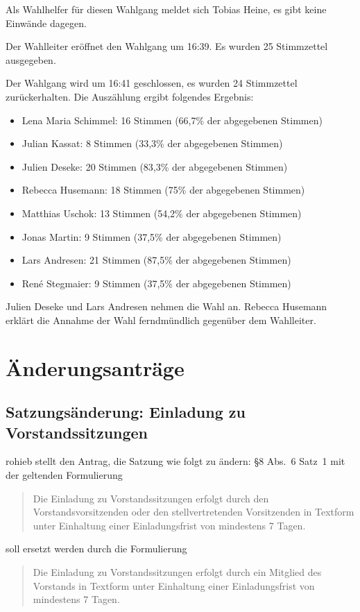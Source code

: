 \documentclass[a4paper,12pt]{scrartcl}
\begin{document}
Als Wahlhelfer für diesen Wahlgang meldet sich Tobias Heine, es gibt keine
Einwände dagegen.

Der Wahlleiter eröffnet den Wahlgang um 16:39. Es wurden 25 Stimmzettel
ausgegeben.

Der Wahlgang wird um 16:41 geschlossen, es wurden 24 Stimmzettel zurückerhalten.
Die Auszählung ergibt folgendes Ergebnis:

\begin{itemize}
  \item Lena Maria Schimmel: 16 Stimmen (66{,}7\% der abgegebenen Stimmen)
  \item Julian Kassat: 8 Stimmen (33{,}3\% der abgegebenen Stimmen)
  \item Julien Deseke: 20 Stimmen (83{,}3\% der abgegebenen Stimmen)
  \item Rebecca Husemann: 18 Stimmen (75\% der abgegebenen Stimmen)
  \item Matthias Uschok: 13 Stimmen (54{,}2\% der abgegebenen Stimmen)
  \item Jonas Martin: 9 Stimmen (37{,}5\% der abgegebenen Stimmen)
  \item Lars Andresen: 21 Stimmen (87{,}5\% der abgegebenen Stimmen)
  \item René Stegmaier: 9 Stimmen (37{,}5\% der abgegebenen Stimmen)
\end{itemize}

Julien Deseke und Lars Andresen nehmen die Wahl an. Rebecca Husemann erklärt die
Annahme der Wahl ferndmündlich gegenüber dem Wahlleiter.

\section{Änderungsanträge}

\subsection{Satzungsänderung: Einladung zu Vorstandssitzungen}

rohieb stellt den Antrag, die Satzung wie folgt zu ändern: §8 Abs.~6 Satz~1 mit
der geltenden Formulierung
\begin{quote}
  Die Einladung zu Vorstandssitzungen erfolgt durch den Vorstandsvorsitzenden
  oder den stellvertretenden Vorsitzenden in Textform unter Einhaltung einer
  Einladungsfrist von mindestens 7 Tagen.
\end{quote}
soll ersetzt werden durch die Formulierung
\begin{quote}
  Die Einladung zu Vorstandssitzungen erfolgt durch ein Mitglied des Vorstands
  in Textform unter Einhaltung einer Einladungsfrist von mindestens 7 Tagen.
\end{quote}
\end{document}
